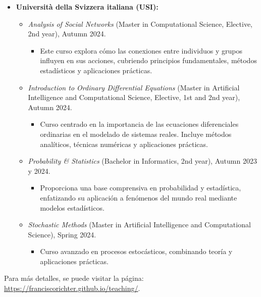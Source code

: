 \documentclass[11pt,a4paper]{article}
\begin{document}
\begin{itemize}
    \item \textbf{Università della Svizzera italiana (USI):}
    \begin{itemize}
        \item \textit{Analysis of Social Networks} (Master in Computational Science, Elective, 2nd year), Autumn 2024.
        \begin{itemize}
            \item Este curso explora cómo las conexiones entre individuos y grupos influyen en sus acciones, cubriendo principios fundamentales, métodos estadísticos y aplicaciones prácticas.
        \end{itemize}
        \item \textit{Introduction to Ordinary Differential Equations} (Master in Artificial Intelligence and Computational Science, Elective, 1st and 2nd year), Autumn 2024.
        \begin{itemize}
            \item Curso centrado en la importancia de las ecuaciones diferenciales ordinarias en el modelado de sistemas reales. Incluye métodos analíticos, técnicas numéricas y aplicaciones prácticas.
        \end{itemize}
        \item \textit{Probability \& Statistics} (Bachelor in Informatics, 2nd year), Autumn 2023 y 2024.
        \begin{itemize}
            \item Proporciona una base comprensiva en probabilidad y estadística, enfatizando su aplicación a fenómenos del mundo real mediante modelos estadísticos.
        \end{itemize}
        \item \textit{Stochastic Methods} (Master in Artificial Intelligence and Computational Science), Spring 2024.
        \begin{itemize}
            \item Curso avanzado en procesos estocásticos, combinando teoría y aplicaciones prácticas.
        \end{itemize}
    \end{itemize}
\end{itemize}

Para más detalles, se puede visitar la página: \href{https://franciscorichter.github.io/teaching/}{https://franciscorichter.github.io/teaching/}.
\end{document}

